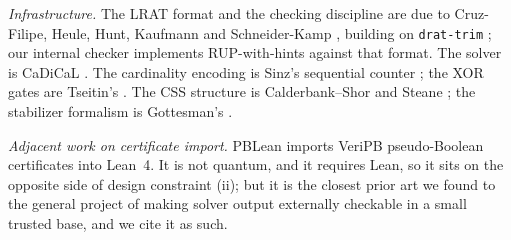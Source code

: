 \documentclass[11pt]{amsart}
\theoremstyle{plain}
\theoremstyle{definition}
\theoremstyle{remark}
\begin{document}
\emph{Infrastructure.} The LRAT format and the checking discipline are due to
Cruz-Filipe, Heule, Hunt, Kaufmann and Schneider-Kamp \cite{LRAT}, building on
\texttt{drat-trim} \cite{DRATtrim}; our internal checker implements
RUP-with-hints against that format. The solver is CaDiCaL \cite{CaDiCaL}. The
cardinality encoding is Sinz's sequential counter \cite{Sinz05}; the XOR gates
are Tseitin's \cite{Tseitin68}. The CSS structure is Calderbank--Shor
\cite{CS96} and Steane \cite{Steane96}; the stabilizer formalism is
Gottesman's \cite{Gottesman97}.

\emph{Adjacent work on certificate import.} PBLean \cite{PBLean} imports
VeriPB pseudo-Boolean certificates into Lean~4. It is not quantum, and it
requires Lean, so it sits on the opposite side of design constraint (ii); but
it is the closest prior art we found to the general project of making
solver output externally checkable in a small trusted base, and we cite it as
such.
\end{document}

